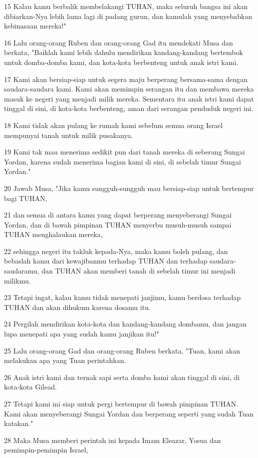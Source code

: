 \par 15 Kalau kamu berbalik membelakangi TUHAN, maka seluruh bangsa ini akan dibiarkan-Nya lebih lama lagi di padang gurun, dan kamulah yang menyebabkan kebinasaan mereka!"
\par 16 Lalu orang-orang Ruben dan orang-orang Gad itu mendekati Musa dan berkata, "Baiklah kami lebih dahulu mendirikan kandang-kandang bertembok untuk domba-domba kami, dan kota-kota berbenteng untuk anak istri kami.
\par 17 Kami akan bersiap-siap untuk segera maju berperang bersama-sama dengan saudara-saudara kami. Kami akan memimpin serangan itu dan membawa mereka masuk ke negeri yang menjadi milik mereka. Sementara itu anak istri kami dapat tinggal di sini, di kota-kota berbenteng, aman dari serangan penduduk negeri ini.
\par 18 Kami tidak akan pulang ke rumah kami sebelum semua orang Israel mempunyai tanah untuk milik pusakanya.
\par 19 Kami tak mau menerima sedikit pun dari tanah mereka di seberang Sungai Yordan, karena sudah menerima bagian kami di sini, di sebelah timur Sungai Yordan."
\par 20 Jawab Musa, "Jika kamu sungguh-sungguh mau bersiap-siap untuk bertempur bagi TUHAN,
\par 21 dan semua di antara kamu yang dapat berperang menyeberangi Sungai Yordan, dan di bawah pimpinan TUHAN menyerbu musuh-musuh sampai TUHAN menghalaukan mereka,
\par 22 sehingga negeri itu takluk kepada-Nya, maka kamu boleh pulang, dan bebaslah kamu dari kewajibanmu terhadap TUHAN dan terhadap saudara-saudaramu, dan TUHAN akan memberi tanah di sebelah timur ini menjadi milikmu.
\par 23 Tetapi ingat, kalau kamu tidak menepati janjimu, kamu berdosa terhadap TUHAN dan akan dihukum karena dosamu itu.
\par 24 Pergilah mendirikan kota-kota dan kandang-kandang dombamu, dan jangan lupa menepati apa yang sudah kamu janjikan itu!"
\par 25 Lalu orang-orang Gad dan orang-orang Ruben berkata, "Tuan, kami akan melakukan apa yang Tuan perintahkan.
\par 26 Anak istri kami dan ternak sapi serta domba kami akan tinggal di sini, di kota-kota Gilead.
\par 27 Tetapi kami ini siap untuk pergi bertempur di bawah pimpinan TUHAN. Kami akan menyeberangi Sungai Yordan dan berperang seperti yang sudah Tuan katakan."
\par 28 Maka Musa memberi perintah ini kepada Imam Eleazar, Yosua dan pemimpin-pemimpin Israel,

